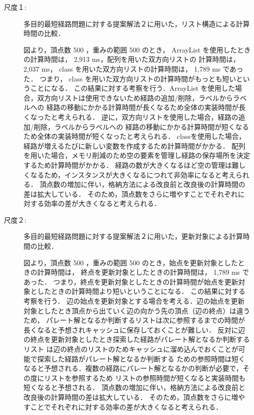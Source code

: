 \documentclass[12pt]{optlab-bachelor}
\begin{document}
\begin{description}
  \item[尺度１:]
  多目的最短経路問題に対する提案解法２に用いた，リスト構造による計算時間の比較．

  図より，頂点数 500 ，重みの範囲 500 のとき， ArrayList を使用したときの計算時間は， 2,913 ms，配列を用いた双方向リストの
  計算時間は， 2,037 ms， class を用いた双方向リストの計算時間は， 1,789 ms であった．
  つまり， class を用いた双方向リストの計算時間がもっとも短いということになる．
  この結果に対する考察を行う．ArrayList を使用した場合，双方向リストは使用できないため経路の追加/削除，ラベルからラベルへの
  経路の移動にかかる計算時間が長くなるため全体の実装時間が長くなったと考えられる．
  逆に，双方向リストを使用した場合，経路の追加/削除，ラベルからラベルへの
  経路の移動にかかる計算時間が短くなるため全体の実装時間が短くなったと考えられる．
  classを使用した場合，経路が増えるたびに新しい変数を作成するため計算時間がかかる．
  配列を用いた場合，メモリ削減のため空の要素を管理し経路の保存場所を決定するため計算時間がかかる．
  経路の数が大きくなるほど空の管理は難しくなるため，インスタンスが大きくなるにつれて非効率になると考えられる．
  頂点数の増加に伴い，格納方法による改良前と改良後の計算時間の差は拡大している．
  そのため，頂点数をさらに増やすことでそれぞれに対する効率の差が大きくなると考えられる．

\end{description}

\begin{description}
  \item[尺度２:]
  多目的最短経路問題に対する提案解法２に用いた，更新対象による計算時間の比較．

  図より，頂点数 500 ，重みの範囲 500 のとき，始点を更新対象としたときの計算時間は，
  終点を更新対象としたときの計算時間は， 1,789 ms であった．
  つまり，終点を更新対象としたときの計算時間が始点を更新対象としたときの計算時間より短いということになる．
  この結果に対する考察を行う．
  辺の始点を更新対象とする場合を考える．辺の始点を更新対象としたとき頂点から出ていく辺の向かう先の頂点（辺の終点）は違うため，
  パレート解となるか判断するリストは次に参照するまでの時間が長くなると予想されキャッシュに保存しておくことが難しい．
  反対に辺の終点を更新対象としたとき探索した経路がパレート解となるか判断するリスト
  は辺の終点のリストのためキャッシュに溜め込んでおくことが可能で探索した経路がパレート解となるか判断する
  ための参照時間は短くなると予想される．複数の経路にパレート解となるかの判断が必要で，その度にリストを参照するため
  リストの参照時間が短くなると実装時間も短くなると予想される．
  頂点数の増加に伴い，格納方法による改良前と改良後の計算時間の差は拡大している．
  そのため，頂点数をさらに増やすことでそれぞれに対する効率の差が大きくなると考えられる．

\end{description}
\end{document}

